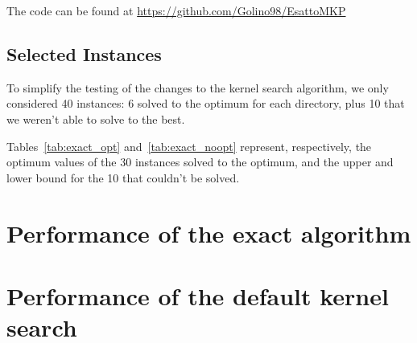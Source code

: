 The code can be found at \url{https://github.com/Golino98/EsattoMKP}

\subsection{Selected Instances}\label{subsec:inst}
To simplify the testing of the changes to the kernel search algorithm,
we only considered 40 instances: 6 solved to the optimum for each directory,
plus 10 that we weren't able to solve to the best.

Tables~\ref{tab:exact_opt} and~\ref{tab:exact_noopt} represent,
respectively, the optimum values of the 30 instances solved to
the optimum, and the upper and lower bound for the 10
that couldn't be solved.





\section{Performance of the exact algorithm}


\section{Performance of the default kernel search}
